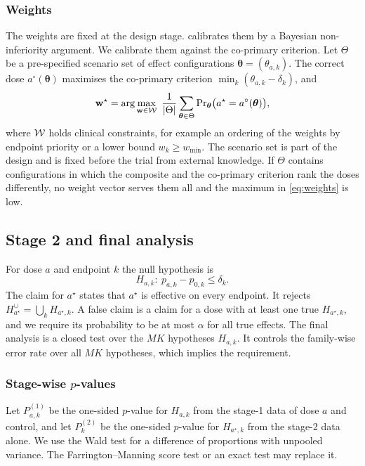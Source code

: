 \subsubsection{Weights}
The weights are fixed at the design stage. \citet{zaslavsky2013} calibrates them by a Bayesian non-inferiority argument. We calibrate them against the co-primary criterion. Let $\Theta$ be a pre-specified scenario set of effect configurations $\bm\theta=(\theta_{a,k})$. The correct dose $a^\circ(\bm\theta)$ maximises the co-primary criterion $\min_k(\theta_{a,k}-\delta_k)$, and
\begin{equation}\label{eq:weights}
\bw^\star=\arg\max_{\bw\in\cW}\ \frac{1}{|\Theta|}\sum_{\bm\theta\in\Theta}\Pr_{\bm\theta}\big(a^\star=a^\circ(\bm\theta)\big),
\end{equation}
where $\mathcal{W}$ holds clinical constraints, for example an ordering of the weights by endpoint priority or a lower bound $w_k\ge w_{\min}$. The scenario set is part of the design and is fixed before the trial from external knowledge. If $\Theta$ contains configurations in which the composite and the co-primary criterion rank the doses differently, no weight vector serves them all and the maximum in \eqref{eq:weights} is low.

\subsection{Stage 2 and final analysis}\label{sec:final}

For dose $a$ and endpoint $k$ the null hypothesis is
\begin{equation*}
H_{a,k}:\ p_{a,k}-p_{0,k}\le\delta_k .
\end{equation*}
The claim for $a^\star$ states that $a^\star$ is effective on every endpoint. It rejects $H^{\cup}_{a^\star}=\bigcup_{k}H_{a^\star,k}$. A false claim is a claim for a dose with at least one true $H_{a^\star,k}$, and we require its probability to be at most $\alpha$ for all true effects. The final analysis is a closed test over the $MK$ hypotheses $H_{a,k}$. It controls the family-wise error rate over all $MK$ hypotheses, which implies the requirement.

\subsubsection{Stage-wise \texorpdfstring{$p$}{p}-values}
Let $P^{(1)}_{a,k}$ be the one-sided $p$-value for $H_{a,k}$ from the stage-1 data of dose $a$ and control, and let $P^{(2)}_k$ be the one-sided $p$-value for $H_{a^\star,k}$ from the stage-2 data alone. We use the Wald test for a difference of proportions with unpooled variance. The Farrington--Manning score test or an exact test may replace it.

